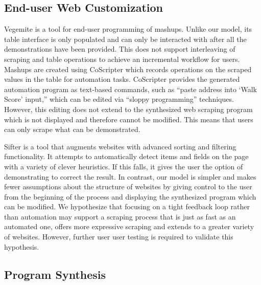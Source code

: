 \documentclass[sigconf,10pt]{acmart}
\begin{document}
\hypertarget{end-user-web-customization}{%
\subsection{End-user Web
Customization}\label{end-user-web-customization}}

Vegemite \citep{lin2009} is a tool for end-user programming of mashups.
Unlike our model, its table interface is only populated and can only be
interacted with after all the demonstrations have been provided. This
does not support interleaving of scraping and table operations to
achieve an incremental workflow for users. Mashups are created using
CoScripter \citep{leshed2008} which records operations on the scraped
values in the table for automation tasks. CoScripter provides the
generated automation program as text-based commands, such as ``paste
address into `Walk Score' input,'' which can be edited via ``sloppy
programming'' \citep{lin2009} techniques. However, this editing does not
extend to the synthesized web scraping program which is not displayed
and therefore cannot be modified. This means that users can only scrape
what can be demonstrated.

Sifter \citep{huynh2006} is a tool that augments websites with advanced
sorting and filtering functionality. It attempts to automatically detect
items and fields on the page with a variety of clever heuristics. If
this falls, it gives the user the option of demonstrating to correct the
result. In contrast, our model is simpler and makes fewer assumptions
about the structure of websites by giving control to the user from the
beginning of the process and displaying the synthesized program which
can be modified. We hypothesize that focusing on a tight feedback loop
rather than automation may support a scraping process that is just as
fast as an automated one, offers more expressive scraping and extends to
a greater variety of websites. However, further user user testing is
required to validate this hypothesis.

\hypertarget{program-synthesis}{%
\subsection{Program Synthesis}\label{program-synthesis}}
\end{document}
